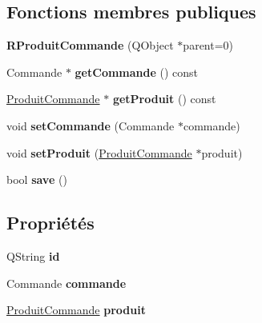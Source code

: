 \subsection*{Fonctions membres publiques}
\begin{DoxyCompactItemize}
\item 
\hypertarget{class_r_produit_commande_a47655dcac0a8d03c07dc1e7c6ce6f094}{
{\bfseries RProduitCommande} (QObject $\ast$parent=0)}
\label{d3/d2d/class_r_produit_commande_a47655dcac0a8d03c07dc1e7c6ce6f094}

\item 
\hypertarget{class_r_produit_commande_a5290a6960e10d41556d204a5842748b0}{
Commande $\ast$ {\bfseries getCommande} () const }
\label{d3/d2d/class_r_produit_commande_a5290a6960e10d41556d204a5842748b0}

\item 
\hypertarget{class_r_produit_commande_aabe48dc4c831017e8a959fcfc7e2b9e1}{
\hyperlink{class_produit_commande}{ProduitCommande} $\ast$ {\bfseries getProduit} () const }
\label{d3/d2d/class_r_produit_commande_aabe48dc4c831017e8a959fcfc7e2b9e1}

\item 
\hypertarget{class_r_produit_commande_ab008cab70aa37ddd04f47dcc7ffce729}{
void {\bfseries setCommande} (Commande $\ast$commande)}
\label{d3/d2d/class_r_produit_commande_ab008cab70aa37ddd04f47dcc7ffce729}

\item 
\hypertarget{class_r_produit_commande_ac294151535a25d1c6251289b46c37b1c}{
void {\bfseries setProduit} (\hyperlink{class_produit_commande}{ProduitCommande} $\ast$produit)}
\label{d3/d2d/class_r_produit_commande_ac294151535a25d1c6251289b46c37b1c}

\item 
\hypertarget{class_r_produit_commande_aca6f81036cc375d36782294338dafe08}{
bool {\bfseries save} ()}
\label{d3/d2d/class_r_produit_commande_aca6f81036cc375d36782294338dafe08}

\end{DoxyCompactItemize}
\subsection*{Propriétés}
\begin{DoxyCompactItemize}
\item 
\hypertarget{class_r_produit_commande_aee1502dcf1b6274ba9ba9eddc566287a}{
QString {\bfseries id}}
\label{d3/d2d/class_r_produit_commande_aee1502dcf1b6274ba9ba9eddc566287a}

\item 
\hypertarget{class_r_produit_commande_afc8ba2f88d481530c8a48fa3dd9b8f23}{
Commande {\bfseries commande}}
\label{d3/d2d/class_r_produit_commande_afc8ba2f88d481530c8a48fa3dd9b8f23}

\item 
\hypertarget{class_r_produit_commande_a0957df5d3d85b00fa5da1867b2151929}{
\hyperlink{class_produit_commande}{ProduitCommande} {\bfseries produit}}
\label{d3/d2d/class_r_produit_commande_a0957df5d3d85b00fa5da1867b2151929}

\end{DoxyCompactItemize}


